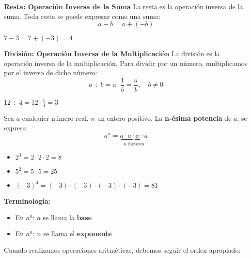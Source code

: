 
\begin{definition}
\textbf{Resta: Operación Inversa de la Suma}
La resta es la operación inversa de la suma. Toda resta se puede expresar como una suma:
$$a - b = a + (-b)$$
\end{definition}

\begin{example}
$7 - 3 = 7 + (-3) = 4$
\end{example}

\begin{definition}
\textbf{División: Operación Inversa de la Multiplicación}
La división es la operación inversa de la multiplicación. Para dividir por un número, multiplicamos por el inverso de dicho número:
$$a \div b = a \cdot \frac{1}{b} = \frac{a}{b}, \quad b \neq 0$$
\end{definition}

\begin{example}
$12 \div 4 = 12 \cdot \frac{1}{4} = 3$
\end{example}


\begin{definition}
Sea $a$ cualquier número real, $n$ un entero positivo. La \textbf{n-ésima potencia} de $a$, se expresa:
$$a^n = \underbrace{a \cdot a \cdot a \cdots a}_{n \text{ factores}}$$
\end{definition}

\begin{example}
\begin{itemize}
\item $2^3 = 2 \cdot 2 \cdot 2 = 8$
\item $5^2 = 5 \cdot 5 = 25$
\item $(-3)^4 = (-3) \cdot (-3) \cdot (-3) \cdot (-3) = 81$
\end{itemize}

\textbf{Terminología:}
\begin{itemize}
\item En $a^n$: $a$ se llama la \textbf{base}
\item En $a^n$: $n$ se llama el \textbf{exponente}
\end{itemize}
\end{example}


Cuando realizamos operaciones aritméticas, debemos seguir el orden apropiado:

